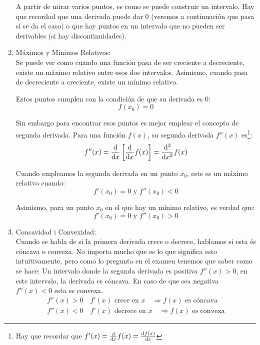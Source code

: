 \documentclass[arial,a4paper,print]{article}
\begin{document}
\begin{enumerate}
\begin{itemize}
\end{itemize}
A partir de mirar varios puntos, es como se puede construir un intervalo. Hay que recordad que una derivada puede dar $0$ (veremos a continuación que pasa si se da el caso) o que hay puntos en un intervalo que no pueden ser derivables (si hay discontinuidades). 

\item Máximos y Mínimos Relativos:\\
Se puede ver como cuando una función pasa de ser creciente a decreciente, existe un máximo relativo entre esos dos intervalos. Asimismo, cuando pasa de decreciente a creciente, existe un mínimo relativo. 

Estos puntos cumplen con la condición de que su derivada es $0$:
\begin{equation*}
	f(x_{0}) = 0
\end{equation*}

Sin embargo para encontrar esos puntos es mejor emplear el concepto de segunda derivada. Para una función $f(x)$, su segunda derivada $f''(x)$ es\footnote{Hay que recordar que $f'(x) = \dv{x}f(x) = \dv{f(x)}{x}$}:
\begin{equation*}
	f''(x) = \dv{x}\left[\dv{x} f(x)\right] = \dv[2]{x}f(x)
\end{equation*}

Cuando empleamos la segunda derivada en un punto $x_{0}$, este es un máximo relativo cuando:
\begin{equation*}
	f'(x_{0}) = 0 \text{ y } f''(x_{0}) < 0
\end{equation*}

Asimismo, para un punto $x_{0}$ en el que hay un mínimo relativo, es verdad que:
\begin{equation*}
	f'(x_{0}) = 0 \text{ y } f''(x_{0}) > 0
\end{equation*}

\item Concavidad i Convexidad:\\
Cuando se habla de si la primera derivada crece o decrece, hablamos si esta és cóncava o convexa. No importa mucho que es lo que significa esto intuitivamente, pero como lo pregunta en el examen tenemos que saber como se hace: Un intervalo donde la segunda derivada es positiva $f''(x) > 0$, en este intervalo, la derivada es cóncava. En caso de que sea negativa $f''(x) < 0 $ esta es convexa. 
\begin{align*}
	f''(x) >0 \quad f'(x) \text{ crece en } x \quad \Rightarrow f(x) \text{ es cóncava} \\
	f''(x) <0 \quad f'(x) \text{ decrece en } x \quad \Rightarrow f(x) \text{ es convexa}
\end{align*}


\end{enumerate}
\end{document}
